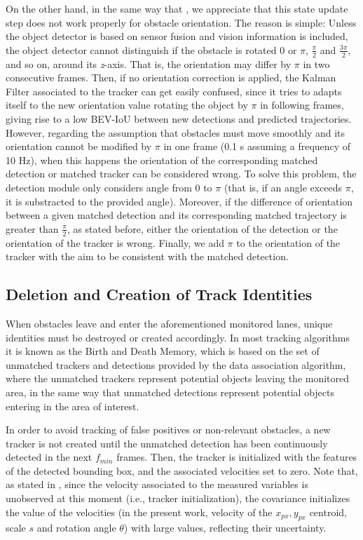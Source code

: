 On the other hand, in the same way that \cite{weng20203d}, we appreciate that this state update step does not work properly for obstacle orientation. The reason is simple: Unless the object detector is based on sensor fusion and vision information is included, the object detector cannot distinguish if the obstacle is rotated 0 or $\pi$, $\frac{\pi}{2}$ and $\frac{3\pi}{2}$, and so on, around its \textit{z}-axis. That is, the orientation may differ by $\pi$ in two consecutive frames. Then, if no orientation correction is applied, the Kalman Filter associated to the tracker can get easily confused, since it tries to adapts itself to the new orientation value rotating the object by $\pi$ in following frames, giving rise to a low BEV-IoU between new detections and predicted trajectories. However, regarding the assumption that obstacles must move smoothly and its orientation cannot be modified by $\pi$ in one frame (0.1 s assuming a frequency of 10 Hz), when this happens the orientation of the corresponding matched detection or matched tracker can be considered wrong. To solve this problem, the detection module only considers angle from 0 to $\pi$ (that is, if an angle exceeds $\pi$, it is substracted to the provided angle). Moreover, if the difference of orientation between a given matched detection and its corresponding matched trajectory is greater than $\frac{\pi}{2}$, as stated before, either the orientation of the detection or the orientation of the tracker is wrong. Finally, we add $\pi$ to the orientation of the tracker with the aim to be consistent with the matched detection. 

\subsection{Deletion and Creation of Track Identities}

When obstacles leave and enter the aforementioned monitored lanes, unique identities must be destroyed or created accordingly. In most tracking algorithms it is known as the Birth and Death Memory, which is based on the set of unmatched trackers and detections provided by the data association algorithm, where the unmatched trackers represent potential objects leaving the monitored area, in the same way that unmatched detections represent potential objects entering in the area of interest. 

In order to avoid tracking of false positives or non-relevant obstacles, a new tracker is not created until the unmatched detection has been continuously detected in the next $f_{min}$ frames. Then, the tracker is initialized with the features of the detected bounding box, and the associated velocities set to zero. Note that, as stated in \cite{bewley2016simple}, since the velocity associated to the measured variables is unobserved at this moment (i.e., tracker initialization), the covariance initializes the value of the velocities (in the present work, velocity of the $x_{px},y_{px}$ centroid, scale $s$ and rotation angle $\theta$) with large values, reflecting their uncertainty. 

